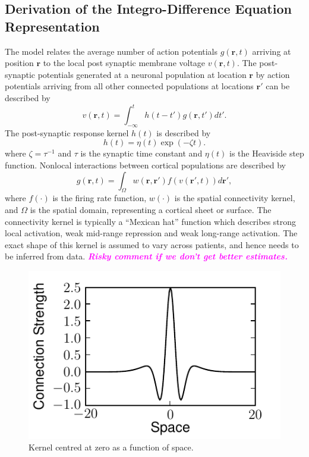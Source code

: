 \documentclass[twocolumn,11pt,a4paper]{article}		%
\newcommand{\ken}[1]{\textsf{\emph{\textbf{\textcolor{magenta}{#1}}}}}
\begin{document}
\subsection{Derivation of the Integro-Difference Equation Representation}
The model relates the average number of action potentials $g(\mathbf{r},t)$ arriving at position $\mathbf{r}$ to the local post synaptic membrane voltage $v(\mathbf{r},t)$. The post-synaptic potentials generated at a neuronal population at location $\mathbf{r}$ by action potentials arriving from all other connected populations at locations $\mathbf{r}'$ can be described by 
\begin{equation}
	\label{SpikesToPotential} v\left( {\mathbf{r},t} \right) = \int_{ - \infty }^t {h\left( {t - t'} \right)g\left( {\mathbf{r},t'} \right)dt'}. 
\end{equation}
The post-synaptic response kernel $h(t)$ is described by 
\begin{equation}
	\label{SynapticRespKernel} h(t) = \eta(t)\exp{\left(-\zeta t\right)}. 
\end{equation}
where $\zeta=\tau^{-1}$ and $\tau$ is the synaptic time constant and $\eta(t)$ is the Heaviside step function. Nonlocal interactions between cortical populations are described by 
\begin{equation}
	\label{RateBasedInteractions} g\left( \mathbf{r},t \right) = \int_\Omega {w\left( \mathbf{r},\mathbf{r}' \right)f\left( v\left( \mathbf{r}',t \right) \right)d\mathbf{r}'}, 
\end{equation}
where $f(\cdot)$ is the firing rate function, $w(\cdot)$ is the spatial connectivity kernel, and $\Omega$ is the spatial domain, representing a cortical sheet or surface. The connectivity kernel is typically a ``Mexican hat'' function which describes strong local activation, weak mid-range repression and weak long-range activation. The exact shape of this kernel is assumed to vary across patients, and hence needs to be inferred from data. \ken{Risky comment if we don't get better estimates.}
\begin{figure}[ th]\label{fig:2d_kernel}
   	\begin{center}
   		\includegraphics{./Graph/Cross_section_kernel.pdf} 
   	\end{center}
   	\caption{Kernel centred at zero as a function of space.} 
   \end{figure}
\end{document}

